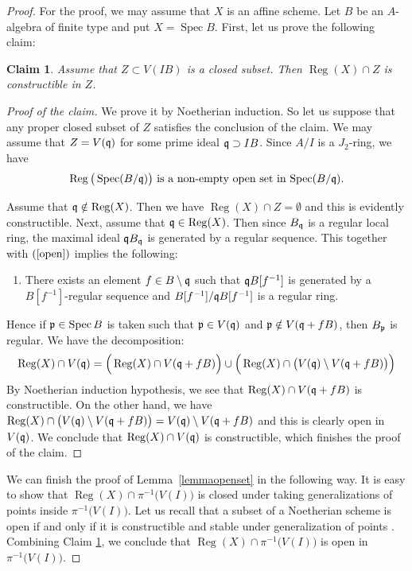 \documentclass[11pt,a4paper]{amsart}
\newtheorem{claim}[theorem]{Claim}
\theoremstyle{definition}
\theoremstyle{remark}
\newcommand{\Spec}{\operatorname{Spec}}
\newcommand{\Reg}{\operatorname{Reg}}
\newcommand{\fp}{\frak{p}}
\newcommand{\fq}{\frak{q}}
\begin{document}
\begin{proof}
For the proof, we may assume that $X$ is an affine scheme.
Let $B$ be an $A$-algebra of finite type and put $X=\Spec B$.
First, let us prove the following claim:

\begin{claim}
\label{subclaim}
Assume that $Z \subset V(IB)$ is a closed subset. Then $\Reg(X) \cap Z$ is constructible in $Z$.
\end{claim}


\begin{proof}[Proof of the claim]
We prove it by Noetherian induction. So let us suppose that any proper closed subset of $Z$ satisfies the conclusion of the claim. We may assume that $Z=V(\fq)$ for some prime ideal $\fq \supset IB$. Since $A/I$ is a $J_2$-ring, we have
\begin{equation}
\label{open}
\mbox{$\Reg\big(\Spec(B/\fq)\big)$ is a non-empty open set in $\Spec(B/\fq)$.}
\end{equation}


Assume that $\fq \notin \Reg(X)$. Then we have $\Reg(X) \cap Z=\emptyset$ and this is evidently constructible. Next, assume that $\fq \in \Reg(X)$. Then since $B_{\fq}$ is a regular local ring, the maximal ideal $\fq B_{\fq}$ is generated by a regular sequence. This together with $(\ref{open})$ implies the following:
\begin{enumerate}
\item[-]
There exists an element $f \in B \setminus \fq$ such that $\fq B[f^{-1}]$ is generated by a $B[f^{-1}]$-regular sequence and $B[f^{-1}]/\fq B[f^{-1}]$ is a regular ring.
\end{enumerate}

Hence if $\fp \in \Spec B$ is taken such that $\fp \in V(\fq)$ and $\fp \notin V(\fq+fB)$, then $B_{\fp}$ is regular. We have the decomposition:
$$
\Reg(X) \cap V(\fq)=\Big(\Reg(X) \cap V(\fq+fB)\Big) \cup \Big(\Reg(X) \cap \big(V(\fq) \setminus V(\fq+fB)\big)\Big)
$$
By Noetherian induction hypothesis, we see that $\Reg(X) \cap V(\fq+fB)$ is constructible. On the other hand, we have $\Reg(X) \cap \big(V(\fq) \setminus V(\fq+fB)\big)=V(\fq) \setminus V(\fq+fB)$ and this is clearly open in $V(\fq)$. We conclude that $\Reg(X) \cap V(\fq)$ is constructible, which finishes the proof of the claim.
\end{proof}


We can finish the proof of Lemma~\ref{lemmaopenset} in the following way. It is easy to show that $\Reg(X) \cap \pi^{-1}\big(V(I)\big)$ is closed under taking generalizations of points inside $\pi^{-1}\big(V(I)\big)$.
Let us recall that a subset of a Noetherian scheme is open if and only if it is constructible and stable under generalization of points \cite[II. Ex. 3.17, 3.18]{Har77}. 
 Combining Claim \ref{subclaim}, we conclude that $\Reg(X) \cap \pi^{-1}\big(V(I)\big)$ is open in $\pi^{-1}\big(V(I)\big)$.
\end{proof}
\end{document}
